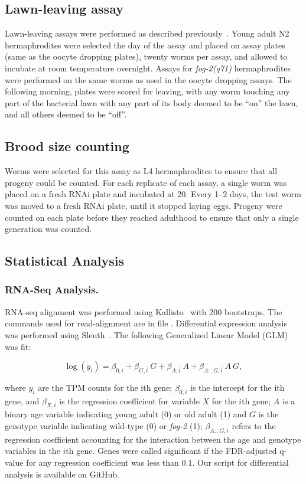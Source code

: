 \documentclass[9pt,twocolumn,twoside]{gsag3jnl}
\newcommand{\fog}{\emph{fog-2}}
\begin{document}
\subsection{Lawn-leaving assay}
\label{sb:lawn_leaving}
Lawn-leaving assays were performed as described previously~\citep{Lipton2004}. Young adult N2 hermaphrodites were selected the day of the assay and placed on assay plates (same as the oocyte dropping plates), twenty worms per assay, and allowed to incubate at room temperature overnight. Assays for \fog{}\emph{(q71)} hermaphrodites were performed on the same worms as used in the oocyte dropping assays. The following morning, plates were scored for leaving, with any worm touching any part of the bacterial lawn with any part of its body deemed to be “on” the lawn, and all others deemed to be “off”.

\subsection{Brood size counting}
\label{sb:brood_size}
Worms were selected for this assay as L4 hermaphrodites to ensure that all progeny could be counted. For each replicate of each assay, a single worm was placed on a fresh RNAi plate and incubated at 20\degree. Every 1--2 days, the test worm was moved to a fresh RNAi plate, until it stopped laying eggs. Progeny were counted on each plate before they reached adulthood to ensure that only a single generation was counted.

\subsection{Statistical Analysis}
\label{sb:statistics}
\subsubsection{RNA-Seq Analysis.}
RNA-seq alignment was performed using Kallisto~\citep{Bray2015} with 200 bootstraps. The commands used for read-alignment are in file %
. Differential expression analysis was performed using Sleuth~\citep{Pimentel2016}. The following Generalized Linear Model (GLM) was fit:

\begin{equation}
  \log(y_i) = \beta_{0,i} + \beta_{G,i}\dot~G + \beta_{A,i}\dot~A + \beta_{A::G,i}\dot~A~G,
  \label{eqn:GLM}
\end{equation}

where $y_i$ are the TPM counts for the ith gene; $\beta_{0,i}$ is the intercept for the ith gene, and $\beta_{X,i}$ is the regression coefficient for variable $X$ for the $i$th gene; $A$ is a binary age variable indicating young adult (0) or old adult (1) and $G$ is the genotype variable indicating wild-type (0) or \fog{} (1); $\beta_{A::G, i}$ refers to the regression coefficient accounting for the interaction between the age and genotype variables in the $i$th gene. Genes were called significant if the FDR-adjusted q-value for any regression coefficient was less than 0.1. Our script for differential analysis is available on GitHub.
\end{document}
